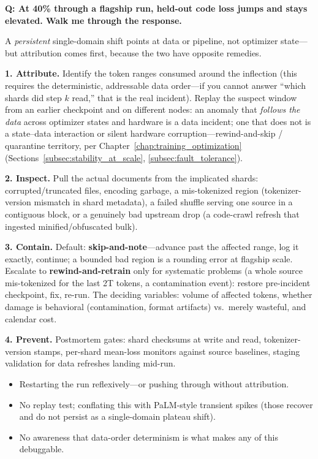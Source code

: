 \begin{interviewq}
\textbf{Q: At 40\% through a flagship run, held-out code loss jumps and stays elevated. Walk me through the response.}

 \quad {} \quad \badgefreq{\freqlow}

\stronganswer
A \textit{persistent} single-domain shift points at data or pipeline, not optimizer state---but attribution comes first, because the two have opposite remedies.

\textbf{1. Attribute.} Identify the token ranges consumed around the inflection (this requires the deterministic, addressable data order---if you cannot answer ``which shards did step $k$ read,'' that is the real incident). Replay the suspect window from an earlier checkpoint and on different nodes: an anomaly that \textit{follows the data} across optimizer states and hardware is a data incident; one that does not is a state--data interaction or silent hardware corruption---rewind-and-skip / quarantine territory, per Chapter~\ref{chap:training_optimization} (Sections~\ref{subsec:stability_at_scale}, \ref{subsec:fault_tolerance}).

\textbf{2. Inspect.} Pull the actual documents from the implicated shards: corrupted/truncated files, encoding garbage, a mis-tokenized region (tokenizer-version mismatch in shard metadata), a failed shuffle serving one source in a contiguous block, or a genuinely bad upstream drop (a code-crawl refresh that ingested minified/obfuscated bulk).

\textbf{3. Contain.} Default: \textbf{skip-and-note}---advance past the affected range, log it exactly, continue; a bounded bad region is a rounding error at flagship scale. Escalate to \textbf{rewind-and-retrain} only for systematic problems (a whole source mis-tokenized for the last 2T tokens, a contamination event): restore pre-incident checkpoint, fix, re-run. The deciding variables: volume of affected tokens, whether damage is behavioral (contamination, format artifacts) vs.\ merely wasteful, and calendar cost.

\textbf{4. Prevent.} Postmortem gates: shard checksums at write and read, tokenizer-version stamps, per-shard mean-loss monitors against source baselines, staging validation for data refreshes landing mid-run.

\redflags
\begin{itemize}
    \item Restarting the run reflexively---or pushing through without attribution.
    \item No replay test; conflating this with PaLM-style transient spikes (those recover and do not persist as a single-domain plateau shift).
    \item No awareness that data-order determinism is what makes any of this debuggable.
\end{itemize}


\end{interviewq}
